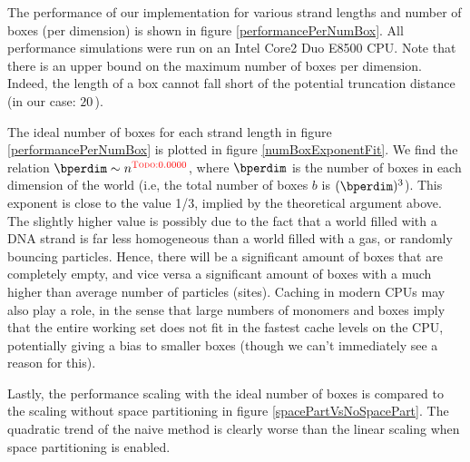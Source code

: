 



The performance of our implementation for various strand lengths and number of boxes (per dimension) is shown in figure \ref{performancePerNumBox}. All performance simulations were run on an Intel Core2 Duo E8500 CPU. Note that there is an upper bound on the maximum number of boxes per dimension. Indeed, the length of a box cannot fall short of the potential truncation distance (in our case: $20$\,\Angstrom).

The ideal number of boxes for each strand length in figure \ref{performancePerNumBox} is plotted in figure \ref{numBoxExponentFit}. We find the relation $\bperdim \sim n^{\todo{0.0000}}$, where $\bperdim$ is the number of boxes in each dimension of the world (i.e, the total number of boxes $b$ is $(\bperdim)^3$). This exponent is close to the value 1/3, implied by the theoretical argument above. The slightly higher value is possibly due to the fact that a world filled with a DNA strand is far less homogeneous than a world filled with a gas, or randomly bouncing particles. Hence, there will be a significant amount of boxes that are completely empty, and vice versa a significant amount of boxes with a much higher than average number of particles (sites). Caching in modern CPUs may also play a role, in the sense that large numbers of monomers and boxes imply that the entire working set does not fit in the fastest cache levels on the CPU, potentially giving a bias to smaller boxes (though we can't immediately see a reason for this).

Lastly, the performance scaling with the ideal number of boxes is compared to the scaling without space partitioning in figure \ref{spacePartVsNoSpacePart}. The quadratic trend of the naive method is clearly worse than the linear scaling when space partitioning is enabled.

